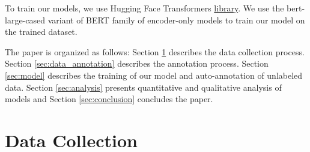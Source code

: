 \documentclass[11pt]{article}
\begin{document}
To train our models, we use Hugging Face Transformers \href{https://huggingface.co/docs/transformers/index}{library}. We use the bert-large-cased variant of BERT family of encoder-only models to train our model on the trained dataset.

The paper is organized as follows: Section \ref{sec:data_collection} describes the data collection process. Section \ref{sec:data_annotation} describes the annotation process. Section \ref{sec:model} describes the training of our model and auto-annotation of unlabeled data. Section \ref{sec:analysis} presents quantitative and qualitative analysis of models and Section \ref{sec:conclusion} concludes the paper.

\section{Data Collection}\label{sec:data_collection}
\end{document}
